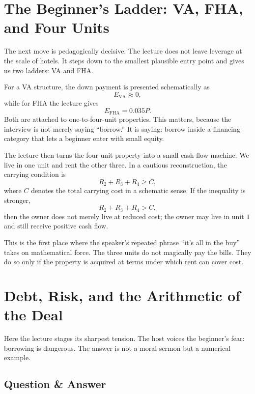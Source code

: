 \section{The Beginner's Ladder: VA, FHA, and Four Units}

The next move is pedagogically decisive. The lecture does not leave leverage at the scale of hotels. It steps down to the smallest plausible entry point and gives us two ladders: VA and FHA.

For a VA structure, the down payment is presented schematically as
\begin{equation}
E_{\text{VA}} \approx 0,
\end{equation}
while for FHA the lecture gives
\begin{equation}
E_{\text{FHA}} = 0.035P.
\end{equation}
Both are attached to one-to-four-unit properties. This matters, because the interview is not merely saying ``borrow.'' It is saying: borrow inside a financing category that lets a beginner enter with small equity.

The lecture then turns the four-unit property into a small cash-flow machine. We live in one unit and rent the other three. In a cautious reconstruction, the carrying condition is
\begin{equation}
R_2 + R_3 + R_4 \geq C,
\end{equation}
where $C$ denotes the total carrying cost in a schematic sense. If the inequality is stronger,
\begin{equation}
R_2 + R_3 + R_4 > C,
\end{equation}
then the owner does not merely live at reduced cost; the owner may live in unit $1$ and still receive positive cash flow.

This is the first place where the speaker's repeated phrase ``it's all in the buy'' takes on mathematical force. The three units do not magically pay the bills. They do so only if the property is acquired at terms under which rent can cover cost.

\section{Debt, Risk, and the Arithmetic of the Deal}

Here the lecture stages its sharpest tension. The host voices the beginner's fear: borrowing is dangerous. The answer is not a moral sermon but a numerical example.

\subsection{Question \& Answer}

